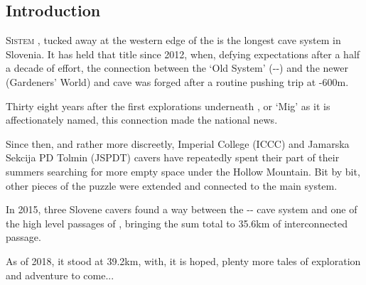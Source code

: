 \begin{tcolorbox} %
\vspace{60pt}
	\part{Introduction}
	\lettrine{S}{istem} , tucked away at the western edge of the  is the longest cave system in Slovenia.  It has held that title since 2012, when, defying expectations after a half a decade of effort, the connection between the `Old System' (--) and the newer  (Gardeners' World) and  cave was forged after a routine pushing trip at -600m.

Thirty eight years after the first explorations underneath , or `Mig' as it is affectionately named, this connection made the national news. 

Since then, and rather more discreetly, Imperial College (ICCC) and Jamarska Sekcija PD Tolmin (JSPDT) cavers have repeatedly spent their part of their summers searching for more empty space under the Hollow Mountain. Bit by bit, other pieces of the puzzle were extended and connected to the main system.

In 2015, three Slovene cavers found a way between the -- cave system and one of the high level passages of , bringing the sum total to 35.6km of interconnected passage. 

As of 2018, it stood at 39.2km, with, it is hoped, plenty more tales of exploration and adventure to come...


\end{tcolorbox}
